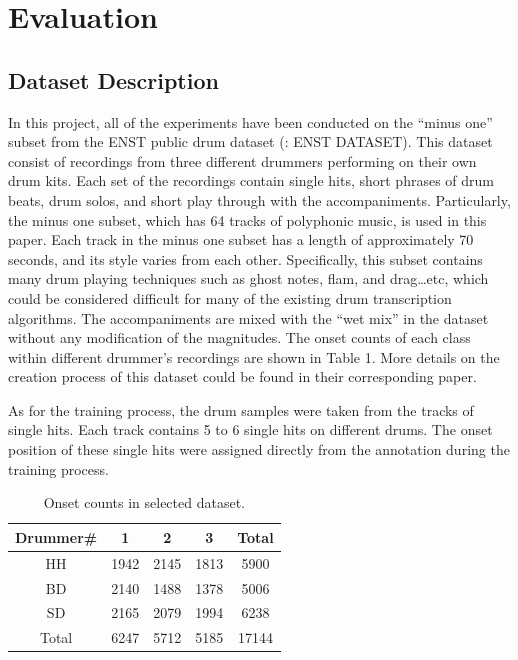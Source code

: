 \documentclass{article}
\begin{document}
\section{Evaluation}\label{sec:Evaluation}
\subsection{Dataset Description}\label{subsec:dataset description}

In this project, all of the experiments have been conducted on the “minus one” subset from the ENST public drum dataset (\cite{}: ENST DATASET). This dataset consist of recordings from three different drummers performing on their own drum kits. Each set of the recordings contain single hits, short phrases of drum beats, drum solos, and short play through with the accompaniments. Particularly, the minus one subset, which has 64 tracks of polyphonic music, is used in this paper. Each track in the minus one subset has a length of approximately 70 seconds, and its style varies from each other. Specifically, this subset contains many drum playing techniques such as ghost notes, flam, and drag…etc, which could be considered difficult for many of the existing drum transcription algorithms. The accompaniments are mixed with the “wet mix” in the dataset without any modification of the magnitudes. The onset counts of each class within different drummer’s recordings are shown in Table 1. More details on the creation process of this dataset could be found in their corresponding paper.  

As for the training process, the drum samples were taken from the tracks of single hits. Each track contains 5 to 6 single hits on different drums. The onset position of these single hits were assigned directly from the annotation during the training process.  
 
\begin{table}[h]
\begin{center}
\begin{tabular}{|c|c|c|c|c|}
\hline
Drummer\# & 1    & 2    & 3    & Total \\ \hline
HH        & 1942 & 2145 & 1813 & 5900  \\ \hline
BD        & 2140 & 1488 & 1378 & 5006  \\ \hline
SD        & 2165 & 2079 & 1994 & 6238  \\ \hline
Total     & 6247 & 5712 & 5185 & 17144 \\ \hline
\end{tabular}
 \caption{Onset counts in selected dataset.}
 \label{tab:onsetCount}
\end{center}
\end{table}
\end{document}
